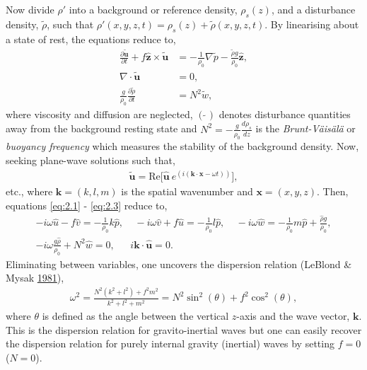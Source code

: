\documentclass[a4paper]{article}
\numberwithin{equation}{section}
\begin{document}
Now divide $\rho'$ into a background or reference density, $
\rho_s(z)$, and a disturbance density, $\tilde{\rho}$, such that $\rho'(x,y,z,t) = \rho_s(z) + \tilde{\rho}(x,y,z,t)$. By linearising about a state of rest, the equations reduce to, 
\begin{align}\label{eq:2.1}
\frac{\partial\mathbf{\tilde{u}}}{\partial t} + f\mathbf{\hat{z}} \times \tilde{\mathbf{u}}&=-\frac{1}{\rho_0} \nabla \tilde{p} - \frac{\tilde{\rho} g}{\rho_0}\mathbf{\hat{z}},\\\label{eq:2.2}
\nabla \cdot \mathbf{\tilde{u}} &= 0,\\\label{eq:2.3}
\frac{g}{\rho_0}\frac{\partial \tilde{\rho}}{\partial t} &= N^2\tilde{w},
\end{align}
where viscosity and diffusion are neglected, $(\tilde{~})$ denotes disturbance quantities away from the background resting state and $N^2 = -\frac{g}{\rho_0}\frac{d\rho_s}{dz}$ is the \emph{Brunt-Väisälä} or \emph{buoyancy frequency} which measures the stability of the background density. Now, seeking plane-wave solutions such that, 
\begin{align*}
\mathbf{\tilde{u}} = \text{Re}\big[ \mathbf{\hat{u}}~ e^{(i(\mathbf{k}\cdot \boldsymbol{x} - \omega t))} \big],
\end{align*}
etc., where $\mathbf{k} = (k, l, m)$ is the spatial wavenumber and $\boldsymbol{x} = (x, y, z)$. Then, equations \eqref{eq:2.1} - \eqref{eq:2.3} reduce to, 
\begin{equation*}
\begin{aligned}
-i\omega \hat{u} - f\hat{v} = - \frac{1}{\rho_0}k\hat{p}, ~~~~~
-i\omega \hat{v} + f\hat{u} = - \frac{1}{\rho_0}l\hat{p}, ~~~~~
-i\omega \hat{w}= - \frac{1}{\rho_0}m\hat{p} + \frac{\hat{\rho}g} {\rho_0},\\
-i\omega \frac{g\hat{\rho}}{\rho_0} + N^2\hat{w} = 0, ~~~~~~~
i\mathbf{k} \cdot \mathbf{\hat{u}} = 0. ~~~~~~~~~~~~~~~~~~~~~~
\end{aligned}
\end{equation*}
Eliminating between variables, one uncovers the dispersion relation (LeBlond \& Mysak \hyperlink{ref 4}{1981}), 
\begin{align}\label{eq:2.4}
\omega^2 = \frac{N^2(k^2 + l^2) + f^2m^2}{k^2 + l^2 + m^2} = N^2\sin^2(\theta) + f^2\cos^2(\theta),
\end{align}
where $\theta$ is defined as the angle between the vertical $z$-axis and the wave vector, $\mathbf{k}$. This is the dispersion relation for gravito-inertial waves but one can easily recover the dispersion relation for purely internal gravity (inertial) waves by setting $f = 0$ ($N = 0$). 
\end{document}
